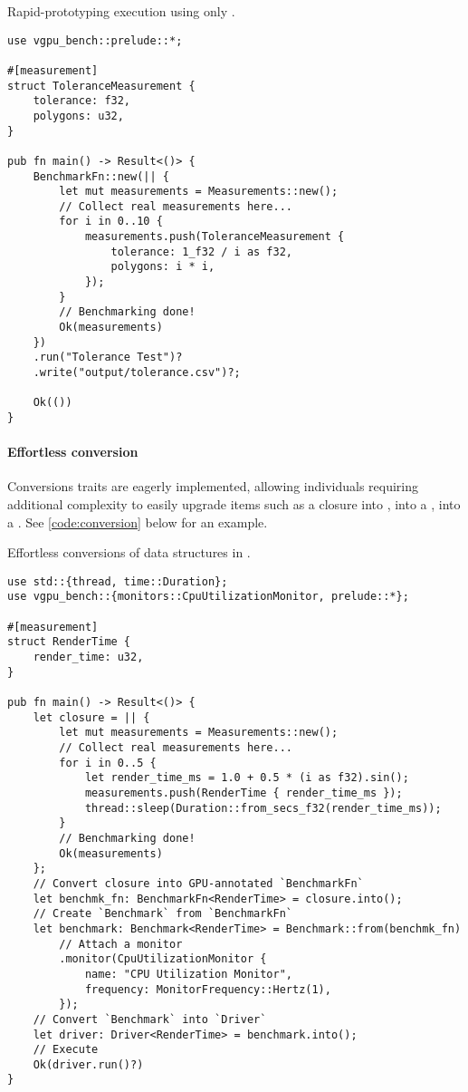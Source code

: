 \begin{snippet}
\caption{Rapid-prototyping execution using only .}\label{code:bfn_run}
\begin{verbatim}
use vgpu_bench::prelude::*;

#[measurement]
struct ToleranceMeasurement {
    tolerance: f32,
    polygons: u32,
}

pub fn main() -> Result<()> {
    BenchmarkFn::new(|| {
        let mut measurements = Measurements::new();
        // Collect real measurements here...
        for i in 0..10 {
            measurements.push(ToleranceMeasurement {
                tolerance: 1_f32 / i as f32,
                polygons: i * i,
            });
        }
        // Benchmarking done!
        Ok(measurements)
    })
    .run("Tolerance Test")?
    .write("output/tolerance.csv")?;

    Ok(())
}
\end{verbatim}
\end{snippet}

\paragraph{Effortless conversion}
Conversions traits are eagerly implemented, allowing individuals requiring additional complexity to easily upgrade items such as a closure into , into a , into a . See \cref{code:conversion} below for an example.\medskip

\begin{snippet}
\caption{Effortless conversions of data structures in \toolname.}\label{code:conversion}
\begin{verbatim}
use std::{thread, time::Duration};
use vgpu_bench::{monitors::CpuUtilizationMonitor, prelude::*};

#[measurement]
struct RenderTime {
    render_time: u32,
}

pub fn main() -> Result<()> {
    let closure = || {
        let mut measurements = Measurements::new();
        // Collect real measurements here...
        for i in 0..5 {
            let render_time_ms = 1.0 + 0.5 * (i as f32).sin();
            measurements.push(RenderTime { render_time_ms });
            thread::sleep(Duration::from_secs_f32(render_time_ms));
        }
        // Benchmarking done!
        Ok(measurements)
    };
    // Convert closure into GPU-annotated `BenchmarkFn`
    let benchmk_fn: BenchmarkFn<RenderTime> = closure.into();
    // Create `Benchmark` from `BenchmarkFn`
    let benchmark: Benchmark<RenderTime> = Benchmark::from(benchmk_fn)
        // Attach a monitor
        .monitor(CpuUtilizationMonitor {
            name: "CPU Utilization Monitor",
            frequency: MonitorFrequency::Hertz(1),
        });
    // Convert `Benchmark` into `Driver`
    let driver: Driver<RenderTime> = benchmark.into();
    // Execute
    Ok(driver.run()?)
}

\end{verbatim}
\end{snippet}


